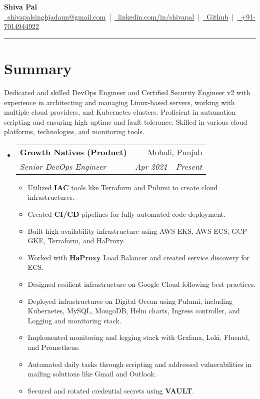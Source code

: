 \documentclass[letterpaper,11pt]{article}
\makeatletter
\newcommand{\resumeSection}[1]{
    \vspace{10pt}
    {\color{darkblue}\hrule}
    \vspace{-5pt}
    \section*{#1}
}
\newcommand{\resumeSubHeading}[4]{
    \vspace{-1pt}
    \item
    \begin{tabular*}{0.97\textwidth}[t]{l@{\extracolsep{\fill}}r}
        \textbf{#1} & #2 \\
        \textit{#3} & \textit{#4} \\
    \end{tabular*}
}
\makeatother
\begin{document}
\begin{center}
    \textbf{\Huge Shiva Pal}\\
    \vspace{15pt}
    \href{mailto:shivapalsinghjadaun@gmail.com}{\faEnvelope\ shivapalsinghjadaun@gmail.com} \,|\, 
    \href{https://www.linkedin.com/in/shivapal/}{\faLinkedin\ linkedin.com/in/shivapal} \,|\, 
    \href{https://shivapal98.github.io/shiva/}{\faGlobe\ Github} \,|\,
    \href{+91-7014944922}{\faMobile\ +91-7014944922}
\end{center}

\resumeSection{Summary}
Dedicated and skilled DevOps Engineer and Certified Security Engineer v2 with experience in architecting and managing Linux-based servers, working with multiple cloud providers, and Kubernetes clusters. Proficient in automation scripting and ensuring high uptime and fault tolerance. Skilled in various cloud platforms, technologies, and monitoring tools.

\begin{itemize}[left=0pt]
    \let\olditem\item %
    \renewcommand{\item}[1][]{\olditem} %
    \resumeSubHeading{Growth Natives (Product)}{Mohali, Punjab}{Senior DevOps Engineer}{Apr 2021 - Present}
    \begin{itemize}
        \item Utilized \textbf{IAC} tools like Terraform and Pulumi to create cloud infrastructures.
        \item Created \textbf{CI/CD} pipelines for fully automated code deployment.
        \item Built high-availability infrastructure using AWS EKS, AWS ECS, GCP GKE, Terraform, and HaProxy.
        \item Worked with \textbf{HaProxy} Load Balancer and created service discovery for ECS.
        \item Designed resilient infrastructure on Google Cloud following best practices.
        \item Deployed infrastructures on Digital Ocean using Pulumi, including Kubernetes, MySQL, MongoDB, Helm charts, Ingress controller, and Logging and monitoring stack.
        \item Implemented monitoring and logging stack with Grafana, Loki, Fluentd, and Prometheus.
        \item Automated daily tasks through scripting and addressed vulnerabilities in mailing solutions like Gmail and Outlook.
        \item Secured and rotated credential secrets using \textbf{VAULT}.
    \end{itemize}
\end{itemize}
\end{document}
